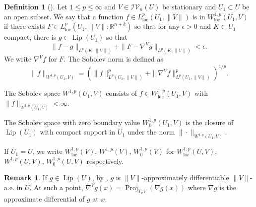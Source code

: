 \documentclass[11pt]{amsart}
\theoremstyle{definition}
\newtheorem{definition}[theorem]{Definition}
\newtheorem{remark}[theorem]{Remark}
\newcommand{\R}{\mathbb{R}}
\newcommand{\IV}{\mathcal{IV}}
\newcommand{\loc}{\mathrm{loc}}
\DeclareMathOperator{\proj}{Proj}
\DeclareMathOperator{\lip}{Lip}
\begin{document}
\begin{definition}[\cite{Me1sobolev}]\label{Sobolev.space}Let $1\le p\le\infty$ and $V\in \IV_n(U)$ be stationary and $U_1\subset U$ be an open subset.
	We say that a function $f\in L^p_\loc(U_1,\|V\|)$ is in $W^{1,p}_\loc(U_1,V)$ if there exists $F\in L^p_\loc (U_1,\|V\|; \R^{n+k})$ so that for any $\epsilon>0$ and $K\subset U_1$ compact, there is $g\in \lip(U_1)$ so that \[\|f-g\|_{L^p(K, \|V\|)}+\|F-\nabla^Vg\|_{L^p(K, \|V\|)}<\epsilon.\]
    We write $\nabla^Vf$ for $F$.
	The Sobolev norm is defined as \[\|f\|_{W^{1,p}(U_1,V)}=(\|f\|_{L^p(U_1,\|V\|)}^p+\|\nabla^Vf\|_{L^p(U_1,\|V\|)}^p)^{1/p}.\]
	
	The Sobolev space $W^{1,p}(U_1,V)$ consists of $f\in W^{1,p}_\loc(U_1,V)$ with $\|f\|_{W^{1,p}(U_1,V)}<\infty$.
	
	The Sobolev space with zero boundary value $W^{1,p}_0(U_1,V)$ is the closure of $\lip(U_1)$ with compact support in $U_1$ under the norm $\|\cdot\|_{W^{1,p}(U_1,V)}$.

    If $U_1=U$, we write $W^{1,p}_\loc(V)$, $W^{1,p}(V)$, $W^{1,p}_0(V)$ for $W^{1,p}_\loc(U,V)$, $W^{1,p}(U,V)$, $W^{1,p}_0(U,V)$  respectively.
\end{definition}

\begin{remark}\label{remark.approx.ambient.functions}
	If $g\in \lip (U)$, by \cite[Example 8.7]{Me2weaklydifferentiable}, $g$ is $\|V\|$-approximately differentiable $\|V\|$-a.e. in $U$. At such a point, $\nabla^V g(x)=\proj_{T_xV}(\nabla g(x))$ where $\nabla g$ is the approximate differential of $g$ at $x$.
\end{remark}
\end{document}
